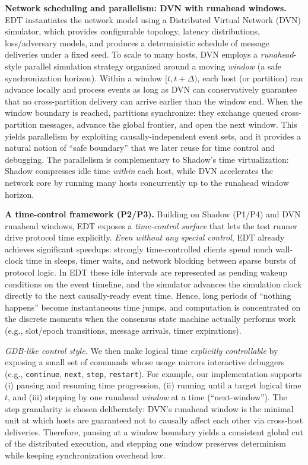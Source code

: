 \smallskip
\noindent\textbf{Network scheduling and parallelism: DVN with runahead windows.}
EDT instantiates the network model using a Distributed Virtual Network (DVN) simulator, which provides configurable topology, latency distributions, loss/adversary models, and produces a deterministic schedule of message deliveries under a fixed seed.
To scale to many hosts, DVN employs a \emph{runahead}-style parallel simulation strategy organized around a moving \emph{window} (a safe synchronization horizon).
Within a window \([t, t+\Delta)\), each host (or partition) can advance locally and process events as long as DVN can conservatively guarantee that no cross-partition delivery can arrive earlier than the window end.
When the window boundary is reached, partitions synchronize: they exchange queued cross-partition messages, advance the global frontier, and open the next window.
This yields parallelism by exploiting causally-independent event sets, and it provides a natural notion of ``safe boundary'' that we later reuse for time control and debugging.
The parallelism is complementary to Shadow's time virtualization: Shadow compresses idle time \emph{within} each host, while DVN accelerates the network core by running many hosts concurrently up to the runahead window horizon.

\smallskip
\noindent\textbf{A time-control framework (P2/P3).}
Building on Shadow (P1/P4) and DVN runahead windows, EDT exposes a \emph{time-control surface} that lets the test runner drive protocol time explicitly.
\emph{Even without any special control}, EDT already achieves significant speedups: strongly time-controlled clients spend much wall-clock time in sleeps, timer waits, and network blocking between sparse bursts of protocol logic.
In EDT these idle intervals are represented as pending wakeup conditions on the event timeline, and the simulator advances the simulation clock directly to the next causally-ready event time.
Hence, long periods of ``nothing happens'' become instantaneous time jumps, and computation is concentrated on the discrete moments when the consensus state machine actually performs work (e.g., slot/epoch transitions, message arrivals, timer expirations).

\smallskip
\noindent\emph{GDB-like control style.}
We then make logical time \emph{explicitly controllable} by exposing a small set of commands whose usage mirrors interactive debuggers (e.g., \texttt{continue}, \texttt{next}, \texttt{step}, \texttt{restart}).
For example, our implementation supports (i) pausing and resuming time progression, (ii) running until a target logical time \(t\), and (iii) stepping by one runahead \emph{window} at a time (``next-window'').
The step granularity is chosen deliberately: DVN's runahead window is the minimal unit at which hosts are guaranteed not to causally affect each other via cross-host deliveries.
Therefore, pausing at a window boundary yields a consistent global cut of the distributed execution, and stepping one window preserves determinism while keeping synchronization overhead low.

